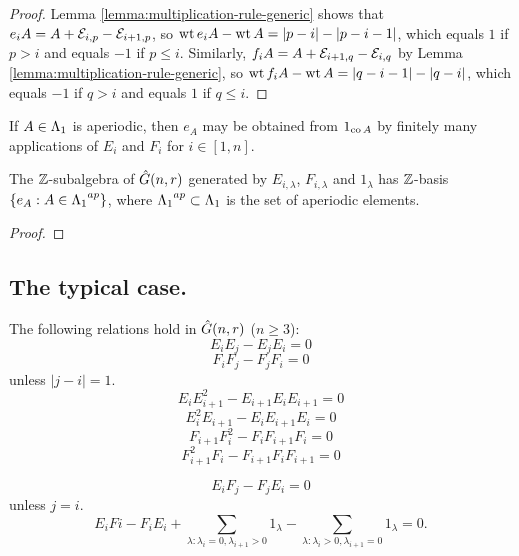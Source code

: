 \documentclass[a4paper, 11pt]{report}
\begin{document}
\begin{proof}
Lemma \ref{lemma:multiplication-rule-generic} shows that $e_iA = A+\mathcal{E}_{i,p}-\mathcal{E}_{i+1,p}$, so $\operatorname{wt}{e_iA} - \operatorname{wt}{A} = |p-i| - |p-i-1|$, which equals $1$ if $p>i$ and equals $-1$ if $p\le i$. Similarly, $f_iA = A + \mathcal{E}_{i+1,q} - \mathcal{E}_{i,q}$ by Lemma \ref{lemma:multiplication-rule-generic}, so $\operatorname{wt}{f_iA} - \operatorname{wt}{A} = |q-i-1| - |q-i|$, which equals $-1$ if $q>i$ and equals $1$ if $q\le i$.
\end{proof}

\begin{lemma}\label{lemma:factorising-aperiodic-elements}
If $A\in{\Lambda_1}$ is aperiodic, then $e_A$ may be obtained from $1_{\operatorname{co}{A}}$ by finitely many applications of $E_i$ and $F_i$ for $i\in[1,n]$.
\end{lemma}

\begin{proposition}
The $\mathbb{Z}$-subalgebra of $\hat{G}(n,r)$ generated by $E_{i,\lambda}$, $F_{i,\lambda}$ and $1_\lambda$ has $\mathbb{Z}$-basis $\{e_A:A\in{\Lambda_1}^{ap}\}$, where ${\Lambda_1}^{ap}\subset{\Lambda_1}$ is the set of aperiodic elements.
\end{proposition}

\begin{proof}

\end{proof}

\subsection{The typical case.}

\begin{lemma}
The following relations hold in $\hat{G}(n,r)$ ($n\geq 3$):
\begin{equation*}
E_iE_j - E_jE_i = 0
\end{equation*}
\begin{equation*}
F_iF_j - F_jF_i = 0
\end{equation*}
unless $|j-i|=1$.
\begin{equation*}
E_iE_{i+1}^2 - E_{i+1}E_iE_{i+1} = 0
\end{equation*}
\begin{equation*}
E_i^2E_{i+1} - E_iE_{i+1}E_i = 0
\end{equation*}
\begin{equation*}
F_{i+1}F_i^2 - F_iF_{i+1}F_i = 0
\end{equation*}
\begin{equation*}
F_{i+1}^2F_i - F_{i+1}F_iF_{i+1} = 0
\end{equation*}

\begin{equation*}
E_iF_j - F_jE_i = 0
\end{equation*}
unless $j=i$.
\begin{equation*}
E_iFi - F_iE_i + \sum_{\lambda:\lambda_i = 0,\lambda_{i+1}>0} 1_\lambda - \sum_{\lambda:\lambda_i>0, \lambda_{i+1}=0} 1_\lambda = 0.
\end{equation*}
\end{lemma}
\end{document}
